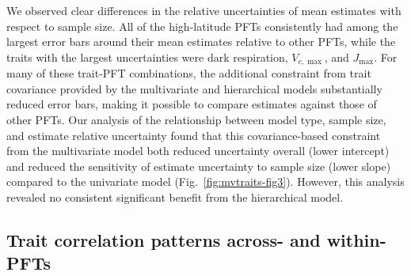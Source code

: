 We observed clear differences in the relative uncertainties of mean estimates with respect to sample size.
All of the high-latitude PFTs consistently had among the largest error bars around their mean estimates relative to other PFTs, while the traits with the largest uncertainties were dark respiration, $V_{c,\max}$, and $J_{\max}$.
For many of these trait-PFT combinations, the additional constraint from trait covariance provided by the multivariate and hierarchical models substantially reduced error bars, making it possible to compare estimates against those of other PFTs.
Our analysis of the relationship between model type, sample size, and estimate relative uncertainty found that this covariance-based constraint from the multivariate model both reduced uncertainty overall (lower intercept) and reduced the sensitivity of estimate uncertainty to sample size (lower slope) compared to the univariate model (Fig.~\ref{fig:mvtraits-fig3}).
However, this analysis revealed no consistent significant benefit from the hierarchical model.


\subsection{Trait correlation patterns across- and within-PFTs}

